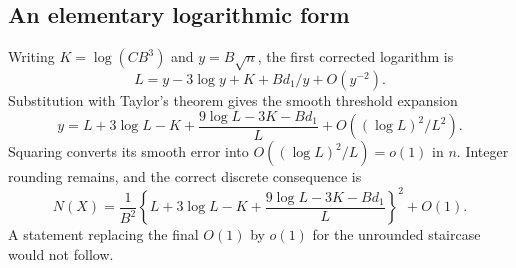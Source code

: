 \documentclass[11pt,letterpaper]{article}
\numberwithin{equation}{section}
\theoremstyle{definition}\newtheorem{definition}[theorem]{Definition}
\theoremstyle{remark}\newtheorem{remark}[theorem]{Remark}
\begin{document}
\subsection{An elementary logarithmic form}
Writing $K=\log(CB^3)$ and $y=B\sqrt n$, the first corrected logarithm is
\[
L=y-3\log y+K+Bd_1/y+O(y^{-2}).
\]
Substitution with Taylor's theorem gives the smooth threshold expansion
\begin{equation}\label{dmm:eq:yloglog}
y=L+3\log L-K+
\frac{9\log L-3K-Bd_1}{L}
+O((\log L)^2/L^2).
\end{equation}
Squaring converts its smooth error into $O((\log L)^2/L)=o(1)$ in $n$. Integer rounding remains, and the correct discrete consequence is
\begin{equation}\label{dmm:eq:Nloglog}
N(X)=\frac1{B^2}\left\{L+3\log L-K+
\frac{9\log L-3K-Bd_1}{L}\right\}^2+O(1).
\end{equation}
A statement replacing the final $O(1)$ by $o(1)$ for the unrounded staircase would not follow.
\end{document}
